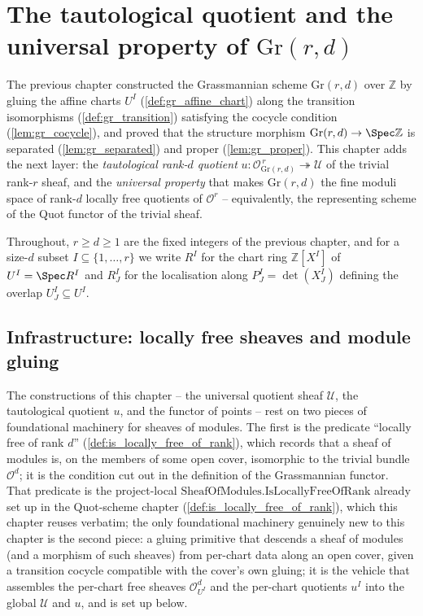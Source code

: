\chapter{The tautological quotient and the universal property of $\mathrm{Gr}(r,d)$}
\label{chap:Picard_GrassmannianQuot}

\providecommand{\ShMod}{\mathrm{SheafOfModules}}

The previous chapter constructed the Grassmannian scheme \(\mathrm{Gr}(r,d)\) over
\(\mathbb{Z}\) by gluing the affine charts \(U^I\)
(\cref{def:gr_affine_chart}) along the transition isomorphisms
(\cref{def:gr_transition}) satisfying the cocycle condition
(\cref{lem:gr_cocycle}), and proved that the structure morphism
\(\mathrm{Gr}(r,d) \to \Spec \mathbb{Z}\) is separated (\cref{lem:gr_separated})
and proper (\cref{lem:gr_proper}). This chapter adds the next layer: the
\emph{tautological rank-\(d\) quotient}
\(u : \mathcal{O}_{\mathrm{Gr}(r,d)}^{\,r} \twoheadrightarrow \mathcal{U}\) of the
trivial rank-\(r\) sheaf, and the \emph{universal property} that makes
\(\mathrm{Gr}(r,d)\) the fine moduli space of rank-\(d\) locally free quotients of
\(\mathcal{O}^{r}\) -- equivalently, the representing scheme of the Quot functor
of the trivial sheaf.

Throughout, \(r \ge d \ge 1\) are the fixed integers of the previous chapter, and
for a size-\(d\) subset \(I \subseteq \{1,\dots,r\}\) we write \(R^I\) for the
chart ring \(\mathbb{Z}[X^I]\) of \(U^I = \Spec R^I\) and \(R^I_J\) for the
localisation along \(P^I_J = \det(X^I_J)\) defining the overlap
\(U^I_J \subseteq U^I\).

\section{Infrastructure: locally free sheaves and module gluing}
\label{sec:grquot_infra}

The constructions of this chapter -- the universal quotient sheaf
\(\mathcal{U}\), the tautological quotient \(u\), and the functor of points -- rest
on two pieces of foundational machinery for sheaves of modules. The first is the
predicate ``locally free of rank \(d\)'' (\cref{def:is_locally_free_of_rank}),
which records that a sheaf of modules is, on the members of some open cover,
isomorphic to the trivial bundle \(\mathcal{O}^{d}\); it is the condition cut out
in the definition of the Grassmannian functor. That predicate is the project-local
\(\mathrm{SheafOfModules.IsLocallyFreeOfRank}\) already set up in the Quot-scheme
chapter (\cref{def:is_locally_free_of_rank}), which this chapter reuses verbatim;
the only foundational machinery genuinely new to this chapter is the second piece:
a gluing primitive that descends a sheaf of modules (and a morphism of such
sheaves) from per-chart data along an open cover, given a transition cocycle
compatible with the cover's own gluing; it is the vehicle that assembles the
per-chart free sheaves \(\mathcal{O}^{d}_{U^I}\) and the per-chart quotients
\(u^I\) into the global \(\mathcal{U}\) and \(u\), and is set up below.

